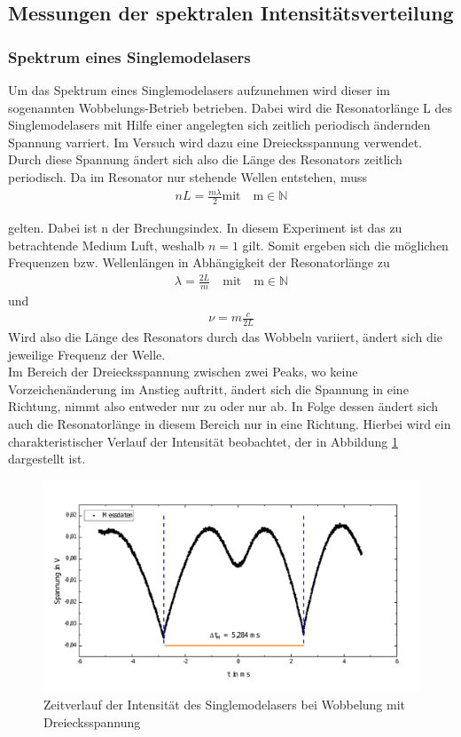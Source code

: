 \documentclass[a4paper,twoside,final]{article}
\begin{document}
\subsection{Messungen der spektralen Intensitätsverteilung}
\subsubsection{Spektrum eines Singlemodelasers}
Um das Spektrum eines Singlemodelasers aufzunehmen wird dieser im sogenannten Wobbelungs-Betrieb betrieben. Dabei wird die Resonatorlänge L des Singlemodelasers mit Hilfe einer angelegten sich zeitlich periodisch ändernden Spannung varriert. Im Versuch wird dazu eine Dreiecksspannung verwendet. Durch diese Spannung ändert sich also die Länge des Resonators zeitlich periodisch. Da im Resonator nur stehende Wellen entstehen, muss
\begin{align}
  nL = \frac{m\lambda}{2} \text{mit} \quad \text{m} \in \mathbb{N}
\end{align}

gelten. Dabei ist n der Brechungsindex.
In diesem Experiment ist das zu betrachtende Medium Luft, weshalb $n=1$ gilt. Somit ergeben sich die möglichen Frequenzen bzw. Wellenlängen in Abhängigkeit der Resonatorlänge zu
\begin{align}
  \lambda = \frac{2L}{m}\quad \text{mit} \quad \text{m}\in \mathbb{N}
\end{align}
und
\begin{align}
  \nu = m \frac{c}{2L}
\end{align}
Wird also die Länge des Resonators durch das Wobbeln variiert, ändert sich die jeweilige Frequenz der Welle. \\
Im Bereich der Dreiecksspannung zwischen zwei Peaks, wo keine Vorzeichenänderung im Anstieg auftritt, ändert sich die Spannung in eine Richtung, nimmt also entweder nur zu oder nur ab. In Folge dessen ändert sich auch die Resonatorlänge in diesem Bereich nur in eine Richtung. Hierbei wird ein charakteristischer Verlauf der Intensität beobachtet, der in Abbildung \ref{fig:Zeitverlauf} dargestellt ist.

\begin{figure}[htp]
    \centering
        \includegraphics[width=1\textwidth]{Bilder/Profil_SML_Zeitverlauf.pdf}
    \caption{Zeitverlauf der Intensität des Singlemodelasers bei Wobbelung mit Dreiecksspannung}
    \label{fig:Zeitverlauf}
\end{figure}
\end{document}
